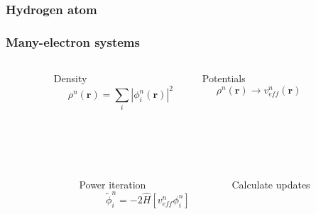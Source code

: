 \documentclass[mathserif, 8pt]{beamer}
\begin{document}
\begin{frame}
    \frametitle{Hydrogen atom}
\end{frame}

\begin{frame}
    \frametitle{Many-electron systems}
    \begin{columns}
    \begin{column}[b]{0.1\textwidth}
    \ \\
    \end{column}
    \begin{column}[b]{0.4\textwidth}
    \centering
    Density
    \begin{equation}
	\nonumber
	\rho^n(\boldsymbol{r}) = \sum_i |\phi_i^n(\boldsymbol{r})|^2
    \end{equation}
    \end{column}
    \begin{column}[b]{0.4\textwidth}
    \centering
    Potentials
    \begin{equation}   
	\nonumber
	\rho^n(\boldsymbol{r}) \rightarrow v_{eff}^n(\boldsymbol{r})
    \end{equation}
    \end{column}
    \begin{column}[b]{0.1\textwidth}
    \ \\
    \end{column}
    \end{columns}
    \ \\
    \ \\
    \begin{columns}
    \begin{column}[b]{0.1\textwidth}
    \ \\
    \end{column}
    \begin{column}[b]{0.4\textwidth}
    \centering
    Power iteration
    \begin{equation}
	\nonumber
	\tilde{\phi}_i^n = -2\hat{H}\left[v_{eff}^n\phi_i^n\right]
    \end{equation}
    \end{column}
    \begin{column}[b]{0.4\textwidth}
    \centering
    Calculate updates

\end{column}
\end{columns}
\end{frame}
\end{document}
